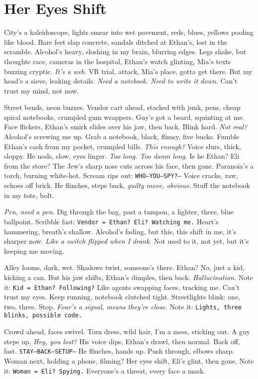 \documentclass[12pt,oneside]{book} %
\newcommand{\note}[1]{\texttt{#1}}
\begin{document}
\chapter{Her Eyes Shift}

City’s a kaleidoscope, lights smear into wet pavement, reds, blues, yellows pooling like blood. Bare feet slap concrete, sandals ditched at Ethan’s, lost in the scramble. Alcohol’s heavy, sloshing in my brain, blurring edges. Legs shake, but thoughts race, cameras in the hospital, Ethan’s watch glinting, Mia’s texts buzzing cryptic. \textit{It’s a web.} VR trial, attack, Mia’s place, gotta get there. But my head’s a sieve, leaking details. \textit{Need a notebook. Need to write it down.} Can’t trust my mind, not now.

Street bends, neon buzzes. Vendor cart ahead, stacked with junk, pens, cheap spiral notebooks, crumpled gum wrappers. Guy’s got a beard, squinting at me. Face flickers, Ethan’s smirk slides over his jaw, then back. Blink hard. \textit{Not real?} Alcohol’s screwing me up. Grab a notebook, black, flimsy, five bucks. Fumble Ethan’s cash from my pocket, crumpled bills. \textit{This enough?} Voice slurs, thick, sloppy. He nods, slow, eyes linger. \textit{Too long. Too damn long.} Is he Ethan? \textnormal{Eli} from the store? The Jew’s sharp nose cuts across his face, then gone. Paranoia’s a torch, burning white-hot. Scream rips out: \note{WHO—YOU—SPY?—} Voice cracks, raw, echoes off brick. He flinches, steps back, \textit{guilty move, obvious.} Stuff the notebook in my tote, bolt.

\textit{Pen, need a pen.} Dig through the bag, past a tampon, a lighter, there, blue ballpoint. Scribble fast: \note{Vendor = Ethan? Eli? Watching me.} Heart’s hammering, breath’s shallow. Alcohol’s fading, but this, this shift in me, it’s sharper now. \textit{Like a switch flipped when I drank.} Not used to it, not yet, but it’s keeping me moving.

Alley looms, dark, wet. Shadows twist, someone’s there. Ethan? No, just a kid, kicking a can. But his jaw shifts, Ethan’s dimples, then back. \textit{Hallucination.} Note it: \note{Kid = Ethan? Following?} Like agents swapping faces, tracking me. Can’t trust my eyes. Keep running, notebook clutched tight. Streetlights blink: one, two, three. Stop. \textit{Four’s a signal, means they’re close.} Note it: \note{Lights, three blinks, possible code.}

Crowd ahead, faces swivel. Torn dress, wild hair, I’m a mess, sticking out. A guy steps up, \textit{Hey, you lost?} His voice dips, Ethan’s drawl, then normal. Back off, fast. \note{STAY—BACK—SETUP—} He flinches, hands up. Push through, elbows sharp. Woman next, holding a phone, filming? Her eyes shift, \textnormal{Eli}’s glint, then gone. Note it: \note{Woman = Eli? Spying.} Everyone’s a threat, every face a mask.
\end{document}
